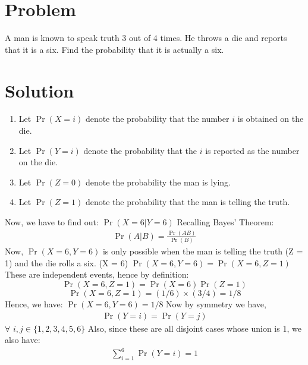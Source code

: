\documentclass[journal,12pt,twocolumn]{IEEEtran}
\begin{document}
\section*{Problem}
A man is known to speak truth 3 out of 4 times. He throws a die and reports that it is a six. Find the probability that it is actually a six.
\section*{Solution}
\begin{enumerate}
    \item Let $\Pr(X=i)$ denote the probability that the number $i$ is obtained on the die.
    \item Let $\Pr(Y=i)$ denote the probability that the $i$ is reported as the number on the die.
    \item Let $\Pr(Z=0)$ denote the probability the man is lying.
    \item Let $\Pr(Z=1)$ denote the probability that the man is telling the truth.
\end{enumerate}
Now, we have to find out: $\Pr(X=6|Y=6)$
\newline \newline Recalling Bayes' Theorem: 
\begin{eqnarray}
   \Pr(A|B)=\frac{\Pr(AB)}{\Pr(B)}    
\end{eqnarray}
\newline Now, $\Pr(X=6, Y=6)$ is only possible when the man is telling the truth (Z = 1) and the die rolls a six. (X = 6)
\newline \newline $\Pr(X=6, Y=6)=\Pr(X=6, Z=1)$
\newline These are independent events, hence by definition:
$$\Pr(X=6, Z=1)=\Pr(X=6)\Pr(Z=1) $$
$$\Pr(X=6, Z=1)=(1/6)\times (3/4)=1/8 $$
Hence, we have: 
\newline $\Pr(X=6, Y=6)=1/8 $
\newline \newline Now by symmetry we have, 
\begin{eqnarray}
   \Pr(Y=i) = \Pr(Y=j)
\end{eqnarray}
$\forall$ $i,j \in \{ 1,2,3,4,5,6 \}$ 
\newline \newline Also, since these are all disjoint cases whose union is 1, we also have:
\begin{eqnarray}
    \sum_{i=1}^{6} \Pr(Y=i) = 1 
\end{eqnarray}
\end{document}
